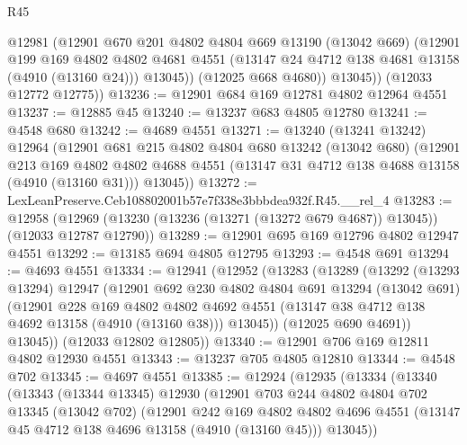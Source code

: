 \begin{lexlean}{R45}
\begin{coremodule}
            @12981
            (@12901
              @670
              @201
              @4802
              @4804
              @669
              @13190
              (@13042 @669)
              (@12901
                @199
                @169
                @4802
                @4802
                @4681
                @4551
                (@13147 @24 @4712 @138 @4681 @13158 (@4910 (@13160 @24)))
                @13045))
            (@12025 @668 @4680))
          @13045))
      (@12033 @12772 @12775))
@13236 := @12901 @684 @169 @12781 @4802 @12964 @4551
@13237 := @12885 @45
@13240 := @13237 @683 @4805 @12780
@13241 := @4548 @680
@13242 := @4689 @4551
@13271 := @13240
    (@13241 @13242)
    @12964
    (@12901
      @681
      @215
      @4802
      @4804
      @680
      @13242
      (@13042 @680)
      (@12901
        @213
        @169
        @4802
        @4802
        @4688
        @4551
        (@13147 @31 @4712 @138 @4688 @13158 (@4910 (@13160 @31)))
        @13045))
@13272 := LexLeanPreserve.Ceb108802001b57e7f338e3bbbdea932f.R45.__rel_4
@13283 := @12958
    (@12969 (@13230 (@13236 (@13271 (@13272 @679 @4687)) @13045)) (@12033 @12787 @12790))
@13289 := @12901 @695 @169 @12796 @4802 @12947 @4551
@13292 := @13185 @694 @4805 @12795
@13293 := @4548 @691
@13294 := @4693 @4551
@13334 := @12941
    (@12952
      (@13283
        (@13289
          (@13292
            (@13293 @13294)
            @12947
            (@12901
              @692
              @230
              @4802
              @4804
              @691
              @13294
              (@13042 @691)
              (@12901
                @228
                @169
                @4802
                @4802
                @4692
                @4551
                (@13147 @38 @4712 @138 @4692 @13158 (@4910 (@13160 @38)))
                @13045))
            (@12025 @690 @4691))
          @13045))
      (@12033 @12802 @12805))
@13340 := @12901 @706 @169 @12811 @4802 @12930 @4551
@13343 := @13237 @705 @4805 @12810
@13344 := @4548 @702
@13345 := @4697 @4551
@13385 := @12924
    (@12935
      (@13334
        (@13340
          (@13343
            (@13344 @13345)
            @12930
            (@12901
              @703
              @244
              @4802
              @4804
              @702
              @13345
              (@13042 @702)
              (@12901
                @242
                @169
                @4802
                @4802
                @4696
                @4551
                (@13147 @45 @4712 @138 @4696 @13158 (@4910 (@13160 @45)))
                @13045))

\end{coremodule}
\end{lexlean}
